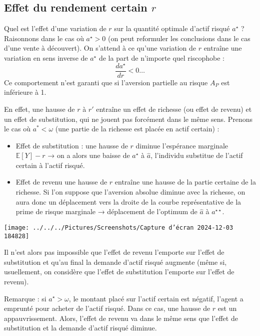 \documentclass[a4paper, 12pt]{report}
\begin{document}
\subsection{Effet du rendement certain \( r \)}

Quel est l'effet d'une variation de \(r\) sur la quantité optimale d'actif risqué \(a^{\star}\) ? Raisonnons dans le cas où \(a^{\star} > 0\) (on peut reformuler les conclusions dans le cas d'une vente à découvert). On s'attend à ce qu'une variation de \(r\) entraîne une variation en sens inverse de \(a^\star\) de la part de n'importe quel riscophobe : 
\[
\frac{da^\star}{dr} < 0 \ldots
\]
Ce comportement n'est garanti que si l'aversion partielle au risque \(A_P\) est inférieure à 1.

En effet, une hausse de \(r\) à \(r'\) entraîne un effet de richesse (ou effet de revenu) et un effet de substitution, qui ne jouent pas forcément dans le même sens. Prenons le cas où \(a^* < \omega\) (une partie de la richesse est placée en actif certain) :

\begin{itemize}
	\item Effet de substitution : une hausse de \(r\) diminue l'espérance marginale \(\mathbb{E}[Y] - r\) → on a alors une baisse de \(a^\star\) à \(\hat{a}\), l'individu substitue de l'actif certain à l'actif risqué.
	\item Effet de revenu une hausse de \(r\) entraîne une hausse de la partie certaine de la richesse. Si l'on suppose que l'aversion absolue diminue avec la richesse, on aura donc un déplacement vers la droite de la courbe représentative de la prime de risque marginale → déplacement de l'optimum de \(\hat{a}\) à \(a^{\star \star}\).
\end{itemize}

\begin{center}
	\texttt{[image: ../../../Pictures/Screenshots/Capture d'écran 2024-12-03 184828]}
\end{center}

Il n'est alors pas impossible que l'effet de revenu l'emporte sur l'effet de substitution et qu'au final la demande d'actif risqué augmente (même si, usuellement, on considère que l'effet de substitution l'emporte sur l'effet de revenu). 

Remarque : si \(a^\star > \omega\), le montant placé sur l'actif certain est négatif, l'agent a emprunté pour acheter de l'actif risqué. Dans ce cas, une hausse de \(r\) est un appauvrissement. Alors, l'effet de revenu va dans le même sens que l'effet de substitution et la demande d'actif risqué diminue.
\end{document}
